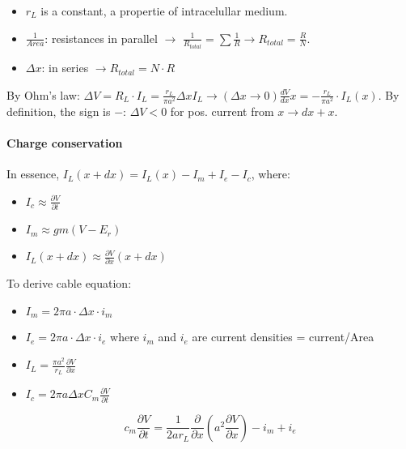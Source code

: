 \documentclass[main]{subfiles}
\begin{document}
\begin{itemize}
\item $r_L$ is a constant, a propertie of intracelullar medium.
\item $\frac{1}{Area}$: resistances in parallel $\rightarrow$ $\frac{1}{R_{total}} = \sum \frac{1}{R} \rightarrow R_{total} = \frac{R}{N}$.
\item $\Delta x$: in series $\rightarrow R_{total} = N \cdot R$
\end{itemize}

By Ohm's law: $\Delta V = R_L \cdot I_L = \frac{r_L}{\pi a^2} \Delta x I_L \rightarrow	(\Delta x \to 0) \frac{dV}{dx} x = - \frac{r_L}{\pi a^2} \cdot I_L(x)$. By definition, the sign is $-$: $\Delta V < 0$ for pos. current from $x \rightarrow dx + x$.

\paragraph{Charge conservation}

\begin{figure}[H]
	\centering
\end{figure}

In essence, $I_L(x + dx) = I_L(x) - I_m + I_e - I_c$, where:
\begin{itemize}
\item $I_c \approx \frac{\partial V}{\partial t}$
\item $I_m \approx gm (V - E_r)$
\item $I_L(x+dx) \approx \frac{\partial V}{\partial x}(x+dx)$
\end{itemize}

To derive cable equation:
\begin{itemize}
\item $I_m = 2 \pi a \cdot \Delta x \cdot i_m$
\item $I_e = 2 \pi a \cdot \Delta x \cdot i_e$
\subitem where $i_m$ and $i_e$ are current densities = current/Area
\item $I_L = \frac{\pi a^2}{r_L} \frac{\partial V}{\partial x}$
\item $I_c = 2 \pi a \Delta x C_m \frac{\partial V}{\partial t}$
\end{itemize}

\[c_m\frac{\partial V}{\partial t} = \frac{1}{2ar_L}\frac{\partial}{\partial x}(a^2\frac{\partial V}{\partial x})-i_m+i_e\]

\begin{figure}[H]
	\centering
\end{figure}
\end{document}

